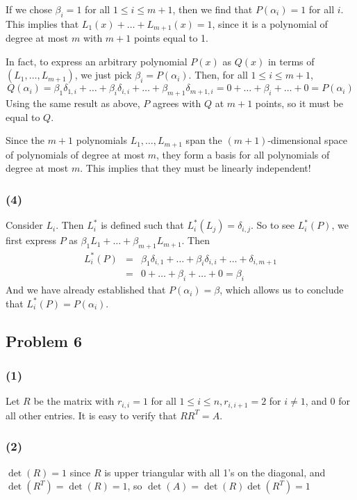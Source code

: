 \documentclass{article}
\begin{document}
If we chose $\beta_i = 1$ for all $1 \leq i \leq m+1$, then we find that
$P(\alpha_i) = 1$ for all $i$. This implies that $L_1(x) + \dots + L_{m+1}(x) =
1$, since it is a polynomial of degree at most $m$ with $m+1$ points equal to 1.

In fact, to express an arbitrary polynomial $P(x)$ as $Q(x)$ in terms of
$(L_1,\dots,L_{m+1})$, we just pick $\beta_i = P(\alpha_i)$.
Then, for all $1 \leq i \leq m+1$,
\[Q(\alpha_i) = \beta_1 \delta_{1,i} + \dots + \beta_i \delta_{i,i} + \dots +
\beta_{m+1} \delta_{m+1,i} = 0 + \dots + \beta_i + \dots + 0 = P(\alpha_i)\]
Using the same result as above, $P$ agrees with $Q$ at $m+1$ points, so it must
be equal to $Q$.

Since the $m+1$ polynomials $L_1,\dots,L_{m+1}$ span the $(m+1)$-dimensional
space of polynomials of degree at most $m$, they form a basis for all
polynomials of degree at most $m$. This implies that they must be linearly
independent!

\subsubsection{(4)}
Consider $L_i$. Then $L_i^*$ is defined such that $L_i^*(L_j) = \delta_{i,j}$.
So to see $L_i^*(P)$, we first express $P$ as $\beta_1 L_1 + \dots + \beta_{m+1}
L_{m+1}$.
Then 
\begin{eqnarray*}
L_i^*(P) &=& \beta_1 \delta_{i,1} + \dots + \beta_i \delta_{i,i} + \dots + \delta_{i,m+1} \\
 &=& 0 + \dots + \beta_i + \dots + 0 = \beta_i
\end{eqnarray*}
And we have already established that $P(\alpha_i) = \beta$, which allows us to
conclude that $L_i^*(P) = P(\alpha_i)$.

\subsection{Problem 6}
\subsubsection{(1)} Let $R$ be the matrix with $r_{i,i}=1$ for all $1\le i\le n, r_{i,i+1}=2$ for $i\neq 1$, and 0 for all other entries. It is easy to verify that $RR^T=A$. 
\subsubsection{(2)} $\det(R)=1$ since $R$ is upper triangular with all 1's on the diagonal, and $\det(R^T)=\det(R)=1$, so $\det(A)=\det(R)\det(R^T)=1$
\end{document}
